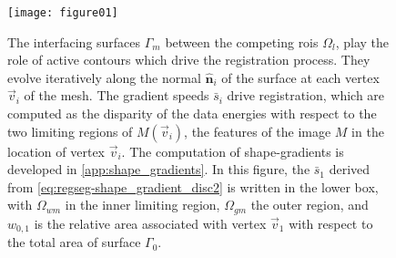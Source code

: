 \begin{figure}
  \texttt{[image: figure01]}
  \caption{The interfacing surfaces $\Gamma_m$ between the competing \glspl{roi} $\Omega_l$,
  play the role of active contours which drive the registration process.
  They evolve iteratively along the normal $\hat{\mathbf{n}}_i$ of the surface at each vertex
    $\vec{v}_i$ of the mesh.
  The gradient speeds $\bar{s}_i$ drive registration, which are computed as the disparity of the data
    energies with respect to the two limiting regions of $M(\vec{v}_i)$, the features of the image
    $M$ in the location of vertex $\vec{v}_i$.
  The computation of shape-gradients is developed in \ref{app:shape_gradients}.
  In this figure, the $\bar{s}_1$ derived from \autoref{eq:regseg-shape_gradient_disc2} is 
    written in the lower box, with $\Omega_{wm}$ in the inner limiting region, $\Omega_{gm}$
    the outer region, and $w_{0,1}$ is the relative area associated with vertex $\vec{v}_1$
    with respect to the total area of surface $\Gamma_0$.
  }\label{fig:regseg-method}
\end{figure}

